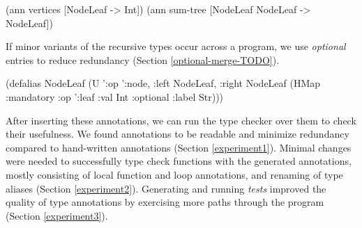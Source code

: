 \begin{cljlisting}
(ann vertices [NodeLeaf -> Int])
(ann sum-tree [NodeLeaf NodeLeaf -> NodeLeaf])
\end{cljlisting}
 
If minor variants of the recursive types occur
across a program,
we use \textit{optional} entries%
to reduce redundancy (Section \ref{optional-merge-TODO}).
 
\begin{cljlisting}
(defalias NodeLeaf 
  (U '{:op ':node, :left NodeLeaf, :right NodeLeaf}
     (HMap :mandatory {:op ':leaf :val Int}
           :optional {:label Str})))
\end{cljlisting}

After inserting these annotations, we can run the
type checker over them to check their usefulness.
We found annotations to be readable and minimize
redundancy compared to hand-written annotations
(Section \ref{experiment1}).
Minimal changes were needed to successfully type check
functions with the generated annotations,
mostly consisting of local function and loop annotations,
and renaming of type aliases
(Section \ref{experiment2}).
Generating and running \textit{tests} improved the quality
of type annotations by exercising more paths through the
program (Section \ref{experiment3}).


%
%
%


